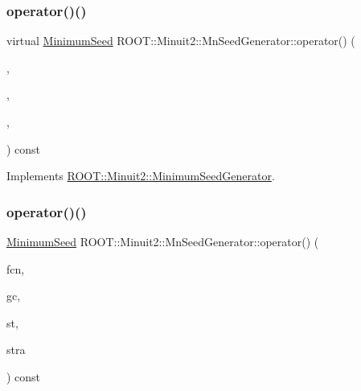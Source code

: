 \subsubsection{\texorpdfstring{operator()()}{operator()()}\hspace{0.1cm}{\footnotesize\ttfamily [4/6]}}
{\footnotesize\ttfamily virtual \mbox{\hyperlink{classROOT_1_1Minuit2_1_1MinimumSeed}{Minimum\+Seed}} R\+O\+O\+T\+::\+Minuit2\+::\+Mn\+Seed\+Generator\+::operator() (\begin{DoxyParamCaption}\item[{const \mbox{\hyperlink{classROOT_1_1Minuit2_1_1MnFcn}{Mn\+Fcn}} \&}]{,  }\item[{const \mbox{\hyperlink{classROOT_1_1Minuit2_1_1AnalyticalGradientCalculator}{Analytical\+Gradient\+Calculator}} \&}]{,  }\item[{const \mbox{\hyperlink{classROOT_1_1Minuit2_1_1MnUserParameterState}{Mn\+User\+Parameter\+State}} \&}]{,  }\item[{const \mbox{\hyperlink{classROOT_1_1Minuit2_1_1MnStrategy}{Mn\+Strategy}} \&}]{ }\end{DoxyParamCaption}) const\hspace{0.3cm}{\ttfamily [virtual]}}



Implements \mbox{\hyperlink{classROOT_1_1Minuit2_1_1MinimumSeedGenerator_a670b9671c73d7e0d3caa148e82d4b2fa}{R\+O\+O\+T\+::\+Minuit2\+::\+Minimum\+Seed\+Generator}}.

\mbox{\label{classROOT_1_1Minuit2_1_1MnSeedGenerator_a300ecb8a37b30fc5bd13c353f3338a92}} 
\subsubsection{\texorpdfstring{operator()()}{operator()()}\hspace{0.1cm}{\footnotesize\ttfamily [5/6]}}
{\footnotesize\ttfamily \mbox{\hyperlink{classROOT_1_1Minuit2_1_1MinimumSeed}{Minimum\+Seed}} R\+O\+O\+T\+::\+Minuit2\+::\+Mn\+Seed\+Generator\+::operator() (\begin{DoxyParamCaption}\item[{const \mbox{\hyperlink{classROOT_1_1Minuit2_1_1MnFcn}{Mn\+Fcn}} \&}]{fcn,  }\item[{const \mbox{\hyperlink{classROOT_1_1Minuit2_1_1AnalyticalGradientCalculator}{Analytical\+Gradient\+Calculator}} \&}]{gc,  }\item[{const \mbox{\hyperlink{classROOT_1_1Minuit2_1_1MnUserParameterState}{Mn\+User\+Parameter\+State}} \&}]{st,  }\item[{const \mbox{\hyperlink{classROOT_1_1Minuit2_1_1MnStrategy}{Mn\+Strategy}} \&}]{stra }\end{DoxyParamCaption}) const\hspace{0.3cm}{\ttfamily [virtual]}}



